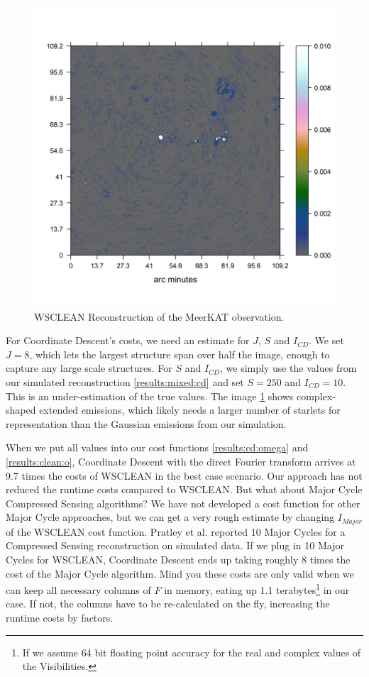\begin{figure}[h]
	\centering
	\includegraphics[width=0.6\linewidth]{./chapters/21.scalability/meerkat.png}
	\caption{WSCLEAN Reconstruction of the MeerKAT observation.}
	\label{scale:wsclean}
\end{figure}

For Coordinate Descent's costs, we need an estimate for $J$, $S$ and $I_{CD}$. We set $J=8$, which lets the largest structure span over half the image, enough to capture any large scale structures. For $S$ and $I_{CD}$, we simply use the values from our simulated reconstruction \ref{results:mixed:cd} and set $S=250$ and 
$I_{CD}=10$. This is an under-estimation of the true values. The image \ref{scale:wsclean} shows complex-shaped extended emissions, which likely needs a larger number of starlets for representation than the Gaussian emissions from our simulation. 

When we put all values into our cost functions \eqref{results:cd:omega} and \eqref{results:clean:o}, Coordinate Descent with the direct Fourier transform arrives at 9.7 times the costs of WSCLEAN in the best case scenario. Our approach has not reduced the runtime costs compared to WSCLEAN. But what about Major Cycle Compressed Sensing algorithms? We have not developed a cost function for other Major Cycle approaches, but we can get a very rough estimate by changing $I_{Major}$ of the WSCLEAN cost function. Pratley et al.\cite{pratley2018fast} reported 10 Major Cycles for a Compressed Sensing reconstruction on simulated data. If we plug in 10 Major Cycles for WSCLEAN, Coordinate Descent ends up taking roughly 8 times the cost of the Major Cycle algorithm. Mind you these costs are only valid when we can keep all necessary columns of $F$ in memory, eating up 1.1 terabytes\footnote{If we assume 64 bit floating point accuracy for the real and complex values of the Visibilities.} in our case. If not, the columns have to be re-calculated on the fly, increasing the runtime costs by factors. 

